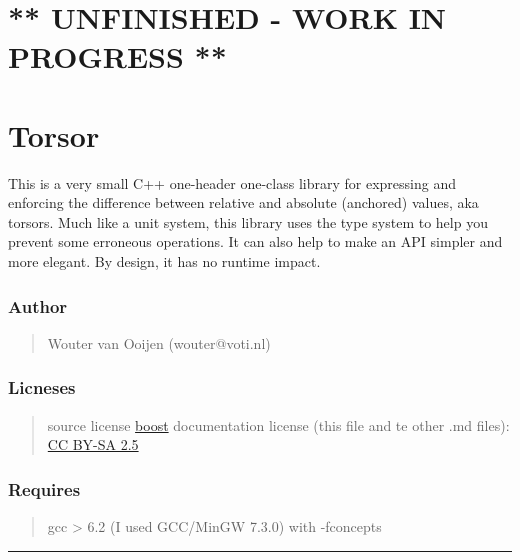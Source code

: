 \documentclass[]{article}
\date{}
\begin{document}
\hypertarget{unfinished---work-in-progress}{%
\section{** UNFINISHED - WORK IN PROGRESS
**}\label{unfinished---work-in-progress}}

\hypertarget{torsor}{%
\section{Torsor}\label{torsor}}

This is a very small C++ one-header one-class library for expressing and
enforcing the difference between relative and absolute (anchored)
values, aka torsors. Much like a unit system, this library uses the type
system to help you prevent some erroneous operations. It can also help
to make an API simpler and more elegant. By design, it has no runtime
impact.

\hypertarget{author}{%
\subsubsection{Author}\label{author}}

\begin{quote}
Wouter van Ooijen (wouter@voti.nl)
\end{quote}

\hypertarget{licneses}{%
\subsubsection{Licneses}\label{licneses}}

\begin{quote}
source license \href{https://www.boost.org/users/license.html}{boost}
documentation license (this file and te other .md files):
\href{https://creativecommons.org/licenses/by-sa/2.5/}{CC BY-SA 2.5}
\end{quote}

\hypertarget{requires}{%
\subsubsection{Requires}\label{requires}}

\begin{quote}
gcc \textgreater{} 6.2 (I used GCC/MinGW 7.3.0) with -fconcepts
\end{quote}

\begin{center}\rule{0.5\linewidth}{\linethickness}\end{center}
\end{document}
